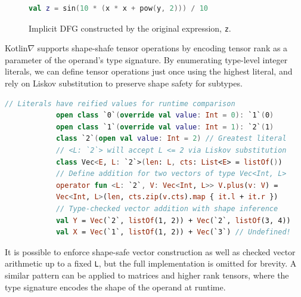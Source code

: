 \documentclass[12pt,initial,twoside,maitrise]{dms}
\numberwithin{equation}{section}
\numberwithin{table}{chapter}
\numberwithin{figure}{chapter}
\begin{document}
\begin{figure}[!htb]
    \begin{lstlisting}[caption={Simple code listing.}, language=Kotlin]
        val z = sin(10 * (x * x + pow(y, 2))) / 10
    \end{lstlisting}
    \centering
    \caption{Implicit DFG constructed by the original expression, \texttt{z}.}
\end{figure}

Kotlin$\nabla$ supports shape-shafe tensor operations by encoding tensor rank as a parameter of the operand's type signature. By enumerating type-level integer literals, we can define tensor operations just once using the highest literal, and rely on Liskov substitution to preserve shape safety for subtypes.

\begin{lstlisting}[caption={Shape safe tensor addition for rank-1 tensors, $\forall L\leq2.$}, language=Kotlin]
            // Literals have reified values for runtime comparison
            open class `0`(override val value: Int = 0): `1`(0)
            open class `1`(override val value: Int = 1): `2`(1)
            class `2`(open val value: Int = 2) // Greatest literal
            // <L: `2`> will accept L <= 2 via Liskov substitution
            class Vec<E, L: `2`>(len: L, cts: List<E> = listOf())
            // Define addition for two vectors of type Vec<Int, L>
            operator fun <L: `2`, V: Vec<Int, L>> V.plus(v: V) =
            Vec<Int, L>(len, cts.zip(v.cts).map { it.l + it.r })
            // Type-checked vector addition with shape inference
            val Y = Vec(`2`, listOf(1, 2)) + Vec(`2`, listOf(3, 4))
            val X = Vec(`1`, listOf(1, 2)) + Vec(`3`) // Undefined!
\end{lstlisting}

It is possible to enforce shape-safe vector construction as well as checked vector arithmetic up to a fixed \texttt{L}, but the full implementation is omitted for brevity. A similar pattern can be applied to matrices and higher rank tensors, where the type signature encodes the shape of the operand at runtime.
\end{document}
